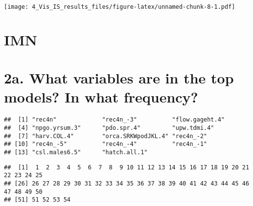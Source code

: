 \documentclass[
]{article}
\newenvironment{Shaded}{\begin{snugshade}}{\end{snugshade}}
\newcommand{\CommentTok}[1]{\textcolor[rgb]{0.56,0.35,0.01}{\textit{#1}}}
\newcommand{\FunctionTok}[1]{\textcolor[rgb]{0.00,0.00,0.00}{#1}}
\newcommand{\NormalTok}[1]{#1}
\newcommand{\SpecialCharTok}[1]{\textcolor[rgb]{0.00,0.00,0.00}{#1}}
\begin{document}
\texttt{[image: 4\_Vis\_IS\_results\_files/figure-latex/unnamed-chunk-8-1.pdf]}

\hypertarget{imn}{%
\section{IMN}\label{imn}}

\hypertarget{a.-what-variables-are-in-the-top-models-in-what-frequency-1}{%
\section{2a. What variables are in the top models? In what
frequency?}\label{a.-what-variables-are-in-the-top-models-in-what-frequency-1}}

\begin{Shaded}
\end{Shaded}

\begin{verbatim}
##  [1] "rec4n"             "rec4n_-3"          "flow.gageht.4"    
##  [4] "npgo.yrsum.3"      "pdo.spr.4"         "upw.tdmi.4"       
##  [7] "harv.COL.4"        "orca.SRKWpodJKL.4" "rec4n_-2"         
## [10] "rec4n_-5"          "rec4n_-4"          "rec4n_-1"         
## [13] "csl.males6.5"      "hatch.all.1"
\end{verbatim}

\begin{Shaded}
\end{Shaded}

\begin{verbatim}
##  [1]  1  2  3  4  5  6  7  8  9 10 11 12 13 14 15 16 17 18 19 20 21 22 23 24 25
## [26] 26 27 28 29 30 31 32 33 34 35 36 37 38 39 40 41 42 43 44 45 46 47 48 49 50
## [51] 51 52 53 54
\end{verbatim}
\end{document}
